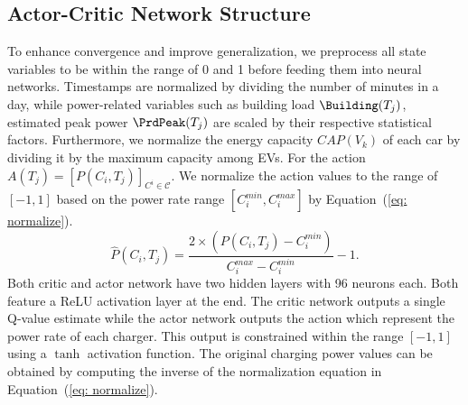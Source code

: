 \subsection{Actor-Critic Network Structure} 
To enhance convergence and improve generalization, we preprocess all state variables to be within the range of 0 and 1 before feeding them into neural networks. Timestamps are normalized by dividing the number of minutes in a day, while power-related variables such as building load $\Building(T_j)$, estimated peak power $\PrdPeak(T_j)$ are scaled by their respective statistical factors. Furthermore, we normalize the energy capacity $CAP(V_k)$ of each car by dividing it by the maximum capacity among EVs. 
For the action $A(T_j)=[P(C_i, T_j)]_{C^{i}\in \mathcal{C}}$. We normalize the action values to the range of $[-1, 1]$ based on the power rate range $[C_i^{min}, C_i^{max}]$ by Equation~(\ref{eq: normalize}).
\begin{equation}
    \hat{P}(C_i, T_j)=\frac{2\times(P(C_i, T_j)-C_i^{min})}{C_i^{max} - C_i^{min}}-1. 
\label{eq: normalize}
\end{equation}
Both critic and actor network have two hidden layers with 96 neurons each. Both feature a ReLU activation layer at the end. The critic network outputs a single Q-value estimate while the actor network outputs the action which represent the power rate of each charger.
This output is constrained within the range $[-1, 1]$ using a $\tanh$ activation function. The original charging power values can be obtained by computing the inverse of the normalization equation in Equation~(\ref{eq: normalize}).  



